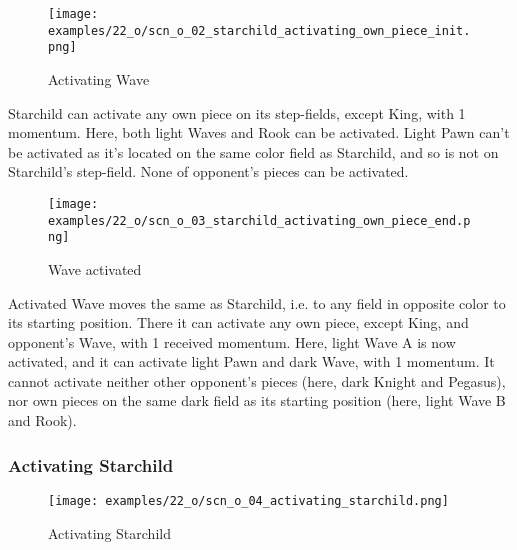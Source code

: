\vspace*{-1.1\baselineskip}
\noindent
\begin{figure}[!h]
\texttt{[image: examples/22\_o/scn\_o\_02\_starchild\_activating\_own\_piece\_init.png]}
\caption{Activating Wave}
\label{fig:scn_o_02_starchild_activating_own_piece_init}
\end{figure}

Starchild can activate any own piece on its step-fields, except King, with 1 momentum. Here,
both light Waves and Rook can be activated. Light Pawn can't be activated as it's located on
the same color field as Starchild, and so is not on Starchild's step-field. None of opponent's
pieces can be activated.

\clearpage %

\vspace*{-2.1\baselineskip}
\noindent
\begin{figure}[!h]
\texttt{[image: examples/22\_o/scn\_o\_03\_starchild\_activating\_own\_piece\_end.png]}
\caption{Wave activated}
\label{fig:scn_o_03_starchild_activating_own_piece_end}
\end{figure}

Activated Wave moves the same as Starchild, i.e. to any field in opposite color to its starting
position. There it can activate any own piece, except King, and opponent's Wave, with 1 received
momentum.
Here, light Wave A is now activated, and it can activate light Pawn and dark Wave, with 1 momentum.
It cannot activate neither other opponent's pieces (here, dark Knight and Pegasus), nor own pieces
on the same dark field as its starting position (here, light Wave B and Rook).

\clearpage %

\subsubsection*{Activating Starchild}

\vspace*{-1.1\baselineskip}
\noindent
\begin{figure}[!h]
\texttt{[image: examples/22\_o/scn\_o\_04\_activating\_starchild.png]}
\caption{Activating Starchild}
\label{fig:scn_o_04_activating_starchild}
\end{figure}

